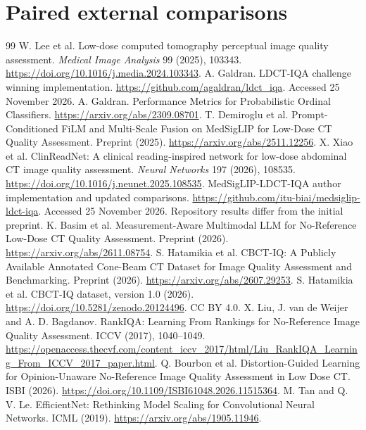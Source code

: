 \documentclass[11pt]{article}
\begin{document}
\section{Paired external comparisons}

\begin{thebibliography}{99}
 W. Lee et al. Low-dose computed tomography perceptual image quality assessment. \emph{Medical Image Analysis} 99 (2025), 103343. \url{https://doi.org/10.1016/j.media.2024.103343}.
 A. Galdran. LDCT-IQA challenge winning implementation. \url{https://github.com/agaldran/ldct_iqa}. Accessed 25 November 2026.
 A. Galdran. Performance Metrics for Probabilistic Ordinal Classifiers. \url{https://arxiv.org/abs/2309.08701}.
 T. Demiroglu et al. Prompt-Conditioned FiLM and Multi-Scale Fusion on MedSigLIP for Low-Dose CT Quality Assessment. Preprint (2025). \url{https://arxiv.org/abs/2511.12256}.
 X. Xiao et al. ClinReadNet: A clinical reading-inspired network for low-dose abdominal CT image quality assessment. \emph{Neural Networks} 197 (2026), 108535. \url{https://doi.org/10.1016/j.neunet.2025.108535}.
 MedSigLIP-LDCT-IQA author implementation and updated comparisons. \url{https://github.com/itu-biai/medsiglip-ldct-iqa}. Accessed 25 November 2026. Repository results differ from the initial preprint.
 K. Basim et al. Measurement-Aware Multimodal LLM for No-Reference Low-Dose CT Quality Assessment. Preprint (2026). \url{https://arxiv.org/abs/2611.08754}.
 S. Hatamikia et al. CBCT-IQ: A Publicly Available Annotated Cone-Beam CT Dataset for Image Quality Assessment and Benchmarking. Preprint (2026). \url{https://arxiv.org/abs/2607.29253}.
 S. Hatamikia et al. CBCT-IQ dataset, version 1.0 (2026). \url{https://doi.org/10.5281/zenodo.20124496}. CC BY 4.0.
 X. Liu, J. van de Weijer and A. D. Bagdanov. RankIQA: Learning From Rankings for No-Reference Image Quality Assessment. ICCV (2017), 1040--1049. \url{https://openaccess.thecvf.com/content_iccv_2017/html/Liu_RankIQA_Learning_From_ICCV_2017_paper.html}.
 Q. Bourbon et al. Distortion-Guided Learning for Opinion-Unaware No-Reference Image Quality Assessment in Low Dose CT. ISBI (2026). \url{https://doi.org/10.1109/ISBI61048.2026.11515364}.
 M. Tan and Q. V. Le. EfficientNet: Rethinking Model Scaling for Convolutional Neural Networks. ICML (2019). \url{https://arxiv.org/abs/1905.11946}.
\end{thebibliography}
\end{document}
